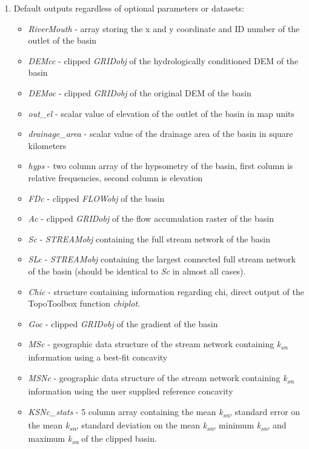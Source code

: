 \begin{enumerate}
	\item Default outputs regardless of optional parameters or datasets:
	\begin{itemize}
		\item \textit{RiverMouth} - array storing the x and y coordinate and ID number of the outlet of the basin
		\item \textit{DEMcc} - clipped \textit{GRIDobj} of the hydrologically conditioned DEM of the basin
		\item \textit{DEMoc} - clipped \textit{GRIDobj} of the original DEM of the basin
		\item \textit{out\_el} - scalar value of elevation of the outlet of the basin in map units
		\item \textit{drainage\_area} - scalar value of the drainage area of the basin in square kilometers
		\item \textit{hyps} - two column array of the hypsometry of the basin, first column is relative frequencies, second column is elevation
		\item \textit{FDc} - clipped \textit{FLOWobj} of the basin
		\item \textit{Ac} - clipped \textit{GRIDobj} of the flow accumulation raster of the basin
		\item \textit{Sc} - \textit{STREAMobj} containing the full stream network of the basin
		\item \textit{SLc} - \textit{STREAMobj} containing the largest connected full stream network of the basin (should be identical to \textit{Sc} in almost all cases).
		\item \textit{Chic} - structure containing information regarding chi, direct output of the TopoToolbox function \textit{chiplot}.
		\item \textit{Goc} - clipped \textit{GRIDobj} of the gradient of the basin
		\item \textit{MSc} - geographic data structure of the stream network containing \textit{k\textsubscript{sn}} information using a best-fit concavity
		\item \textit{MSNc} - geographic data structure of the stream network containing \textit{k\textsubscript{sn}} information using the user supplied reference concavity
		\item \textit{KSNc\_stats} - 5 column array containing the mean \textit{k\textsubscript{sn}}, standard error on the mean \textit{k\textsubscript{sn}}, standard deviation on the  mean \textit{k\textsubscript{sn}}, minimum \textit{k\textsubscript{sn}}, and maximum \textit{k\textsubscript{sn}} of the clipped basin.

\end{itemize}
\end{enumerate}
